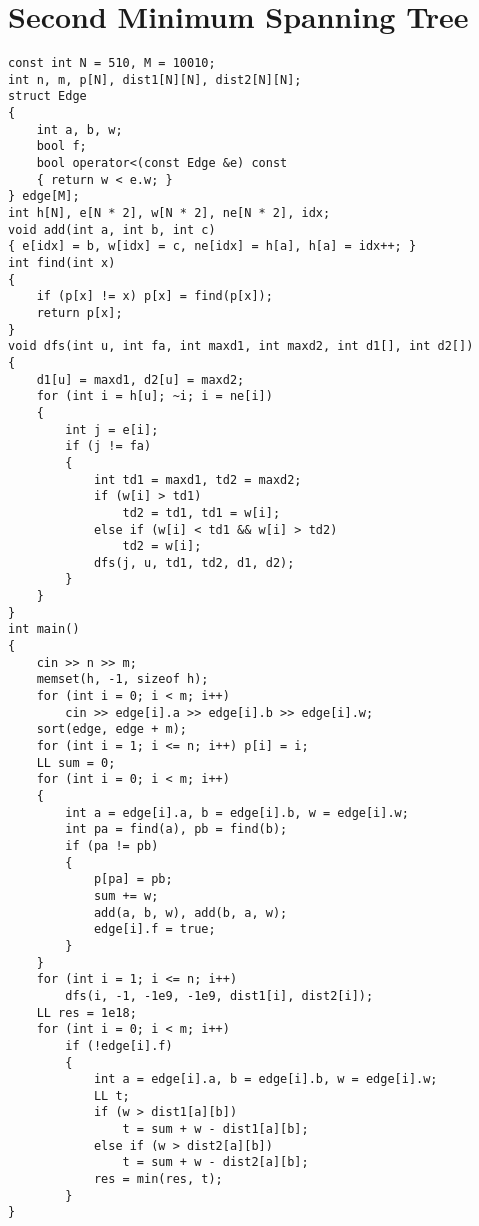 \section{Second Minimum Spanning Tree}
\begin{lstlisting}
const int N = 510, M = 10010;
int n, m, p[N], dist1[N][N], dist2[N][N];
struct Edge
{
    int a, b, w;
    bool f;
    bool operator<(const Edge &e) const 
    { return w < e.w; }
} edge[M];
int h[N], e[N * 2], w[N * 2], ne[N * 2], idx;
void add(int a, int b, int c)
{ e[idx] = b, w[idx] = c, ne[idx] = h[a], h[a] = idx++; }
int find(int x)
{
    if (p[x] != x) p[x] = find(p[x]);
    return p[x];
}
void dfs(int u, int fa, int maxd1, int maxd2, int d1[], int d2[])
{
    d1[u] = maxd1, d2[u] = maxd2;
    for (int i = h[u]; ~i; i = ne[i])
    {
        int j = e[i];
        if (j != fa)
        {
            int td1 = maxd1, td2 = maxd2;
            if (w[i] > td1)
                td2 = td1, td1 = w[i];
            else if (w[i] < td1 && w[i] > td2)
                td2 = w[i];
            dfs(j, u, td1, td2, d1, d2);
        }
    }
}
int main()
{
    cin >> n >> m;
    memset(h, -1, sizeof h);
    for (int i = 0; i < m; i++)
        cin >> edge[i].a >> edge[i].b >> edge[i].w;
    sort(edge, edge + m);
    for (int i = 1; i <= n; i++) p[i] = i;
    LL sum = 0;
    for (int i = 0; i < m; i++)
    {
        int a = edge[i].a, b = edge[i].b, w = edge[i].w;
        int pa = find(a), pb = find(b);
        if (pa != pb)
        {
            p[pa] = pb;
            sum += w;
            add(a, b, w), add(b, a, w);
            edge[i].f = true;
        }
    }
    for (int i = 1; i <= n; i++)
        dfs(i, -1, -1e9, -1e9, dist1[i], dist2[i]);
    LL res = 1e18;
    for (int i = 0; i < m; i++)
        if (!edge[i].f)
        {
            int a = edge[i].a, b = edge[i].b, w = edge[i].w;
            LL t;
            if (w > dist1[a][b])
                t = sum + w - dist1[a][b];
            else if (w > dist2[a][b])
                t = sum + w - dist2[a][b];
            res = min(res, t);
        }
}
\end{lstlisting}
